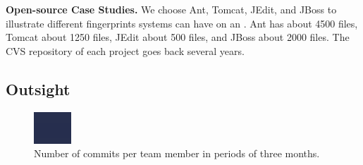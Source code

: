 \documentclass[10pt]{book}
\begin{document}
\textbf{Open-source Case Studies.} We choose Ant, Tomcat, JEdit, and JBoss to illustrate different fingerprints systems can have on an \omap. Ant has about 4500 files, Tomcat about 1250 files, JEdit about 500 files, and JBoss about 2000 files. The CVS repository of each project goes back several years.

\subsection{Outsight}\label{sec:outsight}
\begin{figure}[htbp]
\begin{center}
\includegraphics[width=\columnwidth]{commit-histogram}
\caption{Number of commits per team member in periods of three months.}
\label{fig:histogram}
\end{center}
\end{figure}
\end{document}
